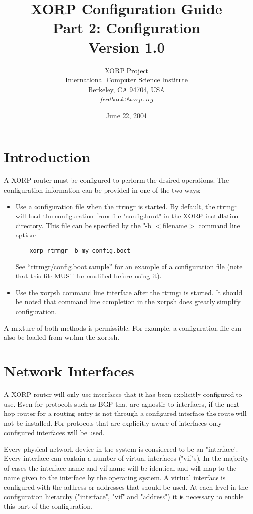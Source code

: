 \documentclass[11pt]{article}
\title{XORP Configuration Guide\\
Part 2: Configuration\\
\vspace{1ex}
Version 1.0}
\author{ XORP Project                                   \\
         International Computer Science Institute       \\
         Berkeley, CA 94704, USA                        \\
         {\it feedback@xorp.org}
}
\date{June 22, 2004}
\begin{document}
\maketitle                            
\section{Introduction}

A XORP router must be configured to perform the desired operations.
The configuration information can be provided in one of the two ways:

\begin{itemize}
\item
  Use a configuration file when the rtrmgr is started.
  By default, the rtrmgr will load the configuration from file
  "config.boot" in the XORP installation directory.
  This file can be specified by the "-b $<$filename$>$ command line
  option:
\begin{verbatim}
    xorp_rtrmgr -b my_config.boot
\end{verbatim}

    See ``rtrmgr/config.boot.sample'' for an example of a
    configuration file (note that this file MUST be modified
    before using it).

\item
  Use the xorpsh command line interface after the rtrmgr is started.
  It should be noted that command line completion in the xorpsh
  does greatly simplify configuration.
\end{itemize}

A mixture of both methods is permissible. For example,
a configuration file can also be loaded from within the xorpsh.

\section{Network Interfaces}

A XORP router will only use interfaces that it has been explicitly
configured to use. Even for protocols such as BGP that are agnostic to
interfaces, if the next-hop router for a routing entry is not through
a configured interface the route will not be installed. For protocols
that are explicitly aware of interfaces only configured interfaces
will be used.

Every physical network device in the system is considered to be an
"interface". Every interface can contain a number of virtual
interfaces ("vif"s). In the majority of cases the interface name and
vif name will be identical and will map to the name given to the
interface by the operating system. A virtual interface is configured
with the address or addresses that should be used. At each level in
the configuration hierarchy ("interface", "vif" and "address") it is
necessary to enable this part of the configuration.
\end{document}
